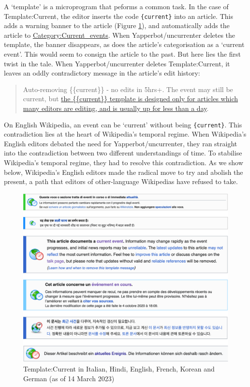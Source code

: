 \documentclass[
  Crown,
  times,
  sageh]{sagej}
\begin{document}
A `template' is a microprogram that peforms a common task. In the case
of Template:Current, the editor inserts the code \texttt{\{current\}}
into an article. This adds a warning banner to the article (Figure
\ref{fig:banner_collage}), and automatically adds the article to
\href{https://en.wikipedia.org/wiki/Category:Current_events}{Category:Current\_events}.
When Yapperbot/uncurrenter deletes the template, the banner disappears,
as does the article's categorisation as a `current event'. This would
seem to consign the article to the past. But here lies the first twist
in the tale. When Yapperbot/uncurrenter deletes Template:Current, it
leaves an oddly contradictory message in the article's edit history:

\begin{quote}
Auto-removing \{\{current\}\} - no edits in 5hrs+. The event may still
be current, but
\href{https://en.wikipedia.org/wiki/Template:Current}{the
\{\{current\}\} template is designed only for articles which many
editors are editing, and is usually up for less than a day}.
\end{quote}

On English Wikipedia, an event can be `current' without being
\texttt{\{current\}}. This contradiction lies at the heart of
Wikipedia's temporal regime. When Wikipedia's English editors debated
the need for Yapperbot/uncurrenter, they ran straight into the
contradiction between two different understandings of time. To stabilise
Wikipedia's temporal regime, they had to resolve this contradiction. As
we show below, Wikipedia's English editors made the radical move to try
and abolish the present, a path that editors of other-language
Wikipedias have refused to take.

\begin{figure}[H]

{\centering \includegraphics[width=1\textwidth,height=\textheight]{images/banner_collage.png}

}

\caption{Template:Current in Italian, Hindi, English, French, Korean and
German (as of 14 March 2023)\label{fig:banner_collage}}

\end{figure}%
\end{document}

